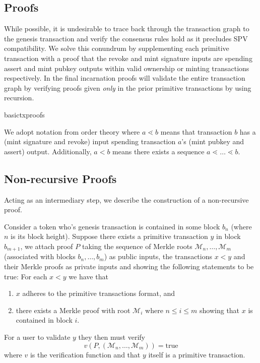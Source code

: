 \documentclass[9pt,oneside]{amsart}
\begin{document}
\begin{multicols}{2}
\section{Proofs}
While possible, it is undesirable to trace back through the transaction graph to the genesis transaction and verify the consensus rules hold as it precludes SPV compatibility. We solve this conundrum by supplementing each primitive transaction with a proof that the revoke and mint signature inputs are spending assert and mint pubkey outputs within valid ownership or minting transactions respectively. In the final incarnation proofs will validate the entire transaction graph by verifying proofs given \emph{only} in the prior primitive transactions by using recursion.

\begin{center}
    {basictxproofs}
\end{center}

We adopt notation from order theory where $a \lessdot b$ means that transaction $b$ has a (mint signature and revoke) input spending transaction $a$'s (mint pubkey and assert) output.  Additionally, $a < b$ means there exists a sequence $a \lessdot \dots \lessdot b$.
\subsection{Non-recursive Proofs}
Acting as an intermediary step, we describe the construction of a non-recursive proof.

Consider a token who's genesis transaction is contained in some block $b_{n}$ (where $n$ is its block height). Suppose there exists a primitive transaction $y$ in block $b_{m+1}$, we attach proof $P$ taking the sequence of Merkle roots $\mathcal{M}_{n}, \dots, \mathcal{M}_{m}$ (associated with blocks $b_{n}, \dots, b_{m}$) as public inputs, the transactions $x < y$ and their Merkle proofs as private inputs and showing the following statements to be true:
For each $x < y$ we have that
\begin{enumerate}
    \item $x$ adheres to the primitive transactions format, and
    \item there exists a Merkle proof with root $\mathcal{M}_{i}$ where $n \leq i \leq m$ showing that $x$ is contained in block $i$.
\end{enumerate}

For a user to validate $y$ they then must verify
\[v(P, (\mathcal{M}_{n}, \dots, \mathcal{M}_{m})) = \text{true}\]
where $v$ is the verification function and that $y$ itself is a primitive transaction.


\end{multicols}
\end{document}

